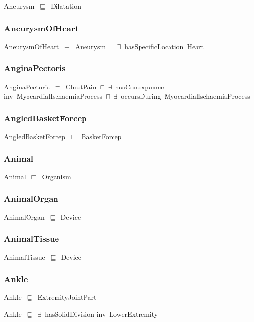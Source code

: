 \documentclass{article}
\begin{document}
Aneurysm~\ensuremath{\sqsubseteq}~Dilatation~

\subsubsection*{AneurysmOfHeart}

AneurysmOfHeart~\ensuremath{\equiv}~Aneurysm~\ensuremath{\sqcap}~\ensuremath{\exists}~hasSpecificLocation~Heart

\subsubsection*{AnginaPectoris}

AnginaPectoris~\ensuremath{\equiv}~ChestPain~\ensuremath{\sqcap}~\ensuremath{\exists}~hasConsequence-inv~MyocardialIschaemiaProcess~\ensuremath{\sqcap}~\ensuremath{\exists}~occursDuring~MyocardialIschaemiaProcess

\subsubsection*{AngledBasketForcep}

AngledBasketForcep~\ensuremath{\sqsubseteq}~BasketForcep~

\subsubsection*{Animal}

Animal~\ensuremath{\sqsubseteq}~Organism~

\subsubsection*{AnimalOrgan}

AnimalOrgan~\ensuremath{\sqsubseteq}~Device~

\subsubsection*{AnimalTissue}

AnimalTissue~\ensuremath{\sqsubseteq}~Device~

\subsubsection*{Ankle}

Ankle~\ensuremath{\sqsubseteq}~ExtremityJointPart~

Ankle~\ensuremath{\sqsubseteq}~\ensuremath{\exists}~hasSolidDivision-inv~LowerExtremity~
\end{document}
